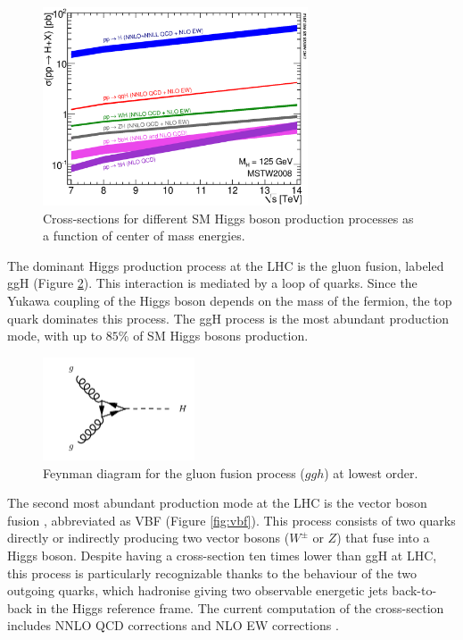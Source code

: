 \begin{figure}
    \centering
    \includegraphics[width=0.7\textwidth]{Images/xsec.eps}
    \caption{Cross-sections for different SM Higgs boson production processes as a function of center of mass energies.}
    \label{fig:higgscrosssec}
\end{figure}

The dominant Higgs production process at the LHC is the gluon fusion, labeled ggH (Figure \ref{fig:ggh}). This interaction is mediated by a loop of quarks. Since the Yukawa coupling of the Higgs boson depends on the mass of the fermion, the top quark dominates this process. The ggH process is the most abundant production mode, with up to $85\%$ of SM Higgs bosons production.


\begin{figure}
    \centering
    \includegraphics[width=0.4\textwidth]{Images/ggh.pdf}
    \caption{Feynman diagram for the gluon fusion process ($ggh$) at lowest order.}
    \label{fig:ggh}
\end{figure}


The second most abundant production mode at the LHC is the vector boson fusion \cite{PhysRevD.85.035002}, abbreviated as VBF (Figure \ref{fig:vbf}). This process consists of two quarks directly or indirectly producing two vector bosons ($W^{\pm}$ or $Z$) that fuse into a Higgs boson. Despite having a cross-section ten times lower than ggH at LHC, this process is particularly recognizable thanks to the behaviour of the two outgoing quarks, which hadronise giving two observable energetic jets back-to-back in the Higgs reference frame. The current computation of the cross-section includes NNLO QCD corrections and NLO EW corrections \cite{deFlorian:2227475}.


